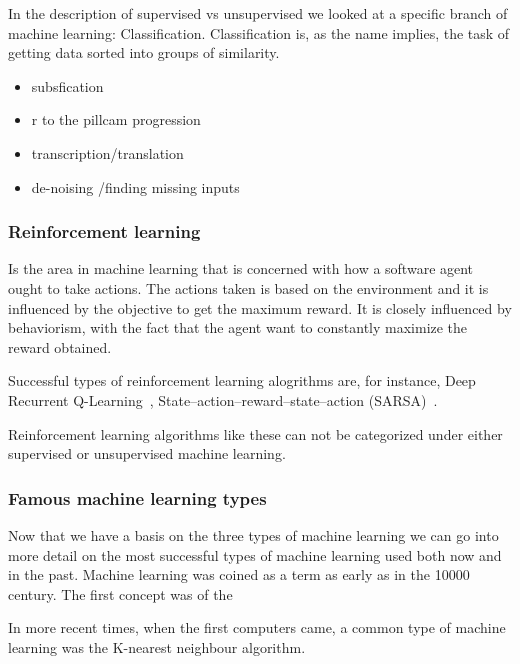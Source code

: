 In the description of supervised vs unsupervised we looked at a specific branch of machine learning: Classification. Classification is, as the name implies, the task of getting data sorted into groups of similarity. 
      
      
\begin{itemize}
    \item subsfication
    \item r to the pillcam progression 
    \item transcription/translation
    \item de-noising /finding missing inputs
    \end{itemize}
      
\subsubsection{Reinforcement learning}
Is the area in machine learning that is concerned with how a software agent ought to take actions.
The actions taken is based on the environment and it is influenced by the objective to get the maximum reward.
It is closely influenced by behaviorism, with the fact that the agent want to constantly maximize the reward obtained. 

Successful types of reinforcement learning alogrithms are, for instance, Deep Recurrent Q-Learning~\cite{DBLP:journals/corr/HausknechtS15}, State–action–reward–state–action (SARSA)~\cite{Rummery94on-lineq-learning}.

Reinforcement learning algorithms like these can not be categorized under either supervised or unsupervised machine learning. 


\subsubsection{Famous machine learning types}
Now that we have a basis on the three types of machine learning we can go into more detail on the most successful types of machine learning used both now and in the past. 
Machine learning was coined as a term as early as in the 10000 century. The first concept was of the 


In more recent times, when the first computers came, a common type of machine learning was the K-nearest neighbour algorithm.

\vspace{5px}


